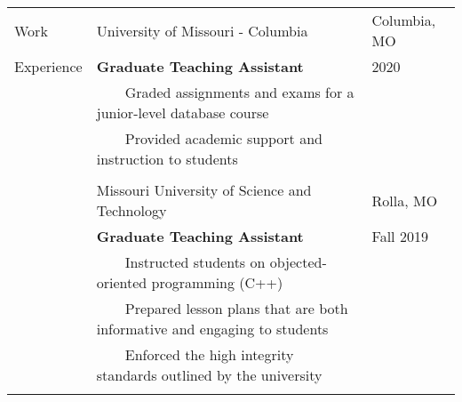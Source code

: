 \documentclass[10.5pt, arial]{article}
\newcommand{\tabitem}{~~\llap{\textbullet}~~}
\begin{document}
\begin{longtable}{p{1.5cm} p{13.2cm} l}
Work        & University of Missouri - Columbia                                 & Columbia, MO          \\
Experience  & \textbf{Graduate Teaching Assistant}                              & 2020                  \\
            & \tabitem Graded assignments and exams for a junior-level database course                  \\
            & \tabitem Provided academic support and instruction to students                            \\ \\

            & Missouri University of Science and Technology                     & Rolla, MO             \\
            & \textbf{Graduate Teaching Assistant}                              & Fall 2019             \\
            & \tabitem Instructed students on objected-oriented programming (C++)  &   \\
            & \tabitem Prepared lesson plans that are both informative and engaging to students      &  \\
            & \tabitem Enforced the high integrity standards outlined by the university             &   \\ \\
            

\end{longtable}
\end{document}

